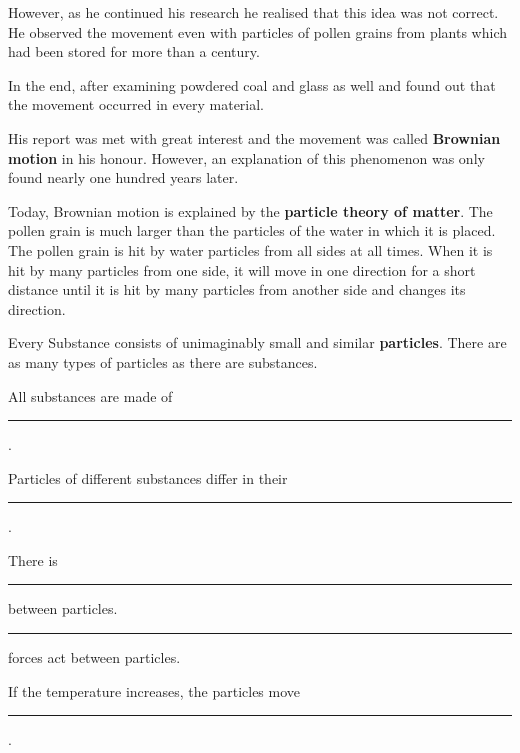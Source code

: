 However, as he continued his research he realised that this idea was not correct. He observed the movement even with particles of pollen grains from plants which had been stored for more than a century.


In the end, after examining powdered coal and glass as well and found out that the movement occurred in every material.


His report was met with great interest and the movement was called \textbf{Brownian motion} in his honour. However, an explanation of this phenomenon was only found nearly one hundred years later.

\WFclear

Today, Brownian motion is explained by the \textbf{particle theory of matter}. The pollen grain is much larger than the particles of the water in which it is placed. The pollen grain is hit by water particles from all sides at all times. When it is hit by many particles from one side, it will move in one direction for a short distance until it is hit by many particles from another side and changes its direction.


\begin{center}%
\resizebox{0.9\linewidth}{!}{\ScientificCycleFigure}\end{center}

\begin{InfoBox}
Every Substance consists of unimaginably small and similar \textbf{particles}. There are as many types of particles as there are substances.
\end{InfoBox}



\begin{ExerciseParts}

\item All substances are made of \rule{67mm}{0.4pt}.

\item Particles of different substances differ in their \rule{67mm}{0.4pt}.

\item There is \rule{67mm}{0.4pt} between particles.

\item \rule{67mm}{0.4pt} forces act between particles.

\item If the temperature increases, the particles move \rule{67mm}{0.4pt}.

\end{ExerciseParts}
